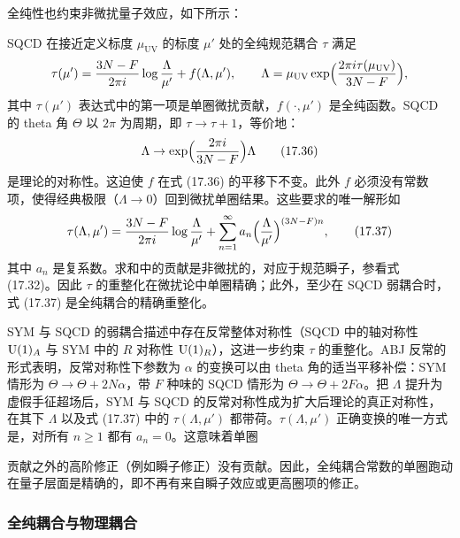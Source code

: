 全纯性也约束非微扰量子效应，如下所示：

\begin{example}[17.45]
SQCD 在接近定义标度 $\mu_{\mathrm{UV}}$ 的标度 $\mu'$ 处的全纯规范耦合 $\tau$ 满足
\[
\tau(\mu')=\frac{3N-F}{2\pi i}\log\frac{\Lambda}{\mu'}+f(\Lambda,\mu'),\qquad
\Lambda=\mu_{\mathrm{UV}}\exp\Bigl(\frac{2\pi i\tau(\mu_{\mathrm{UV}})}{3N-F}\Bigr),
\]
其中 $\tau(\mu')$ 表达式中的第一项是单圈微扰贡献，$f(\cdot,\mu')$ 是全纯函数。SQCD 的 theta 角 $\Theta$ 以 $2\pi$ 为周期，即 $\tau\to\tau+1$，等价地：
\begin{equation}
\Lambda\to\exp\Bigl(\frac{2\pi i}{3N-F}\Bigr)\Lambda
\tag{17.36}
\end{equation}
是理论的对称性。这迫使 $f$ 在式 (17.36) 的平移下不变。此外 $f$ 必须没有常数项，使得经典极限（$\Lambda\to0$）回到微扰单圈结果。这些要求的唯一解形如
\begin{equation}
\tau(\Lambda,\mu')=\frac{3N-F}{2\pi i}\log\frac{\Lambda}{\mu'}+\sum_{n=1}^{\infty}a_n\Bigl(\frac{\Lambda}{\mu'}\Bigr)^{(3N-F)n},
\tag{17.37}
\end{equation}
其中 $a_n$ 是复系数。求和中的贡献是非微扰的，对应于规范瞬子，参看式 (17.32)。因此 $\tau$ 的重整化在微扰论中单圈精确；此外，至少在 SQCD 弱耦合时，式 (17.37) 是全纯耦合的精确重整化。
\end{example}


SYM 与 SQCD 的弱耦合描述中存在反常整体对称性（SQCD 中的轴对称性 $\operatorname{U}(1)_A$ 与 SYM 中的 $R$ 对称性 $\operatorname{U}(1)_R$），这进一步约束 $\tau$ 的重整化。ABJ 反常的形式表明，反常对称性下参数为 $\alpha$ 的变换可以由 theta 角的适当平移补偿：SYM 情形为 $\Theta\to\Theta+2N\alpha$，带 $F$ 种味的 SQCD 情形为 $\Theta\to\Theta+2F\alpha$。把 $\Lambda$ 提升为虚假手征超场后，SYM 与 SQCD 的反常对称性成为扩大后理论的真正对称性，在其下 $\Lambda$ 以及式 (17.37) 中的 $\tau(\Lambda,\mu')$ 都带荷。$\tau(\Lambda,\mu')$ 正确变换的唯一方式是，对所有 $n\ge1$ 都有 $a_n=0$。这意味着单圈

贡献之外的高阶修正（例如瞬子修正）没有贡献。因此，全纯耦合常数的单圈跑动在量子层面是精确的，即不再有来自瞬子效应或更高圈项的修正。

\subsubsection*{全纯耦合与物理耦合}


